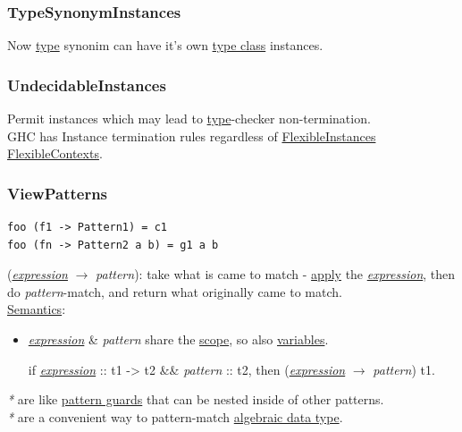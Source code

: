 \documentclass[a4paper,14pt,oneside]{book}
\begin{document}
\subsubsection{\label{orgf954c09}TypeSynonymInstances}
\label{sec:org66b1744}
Now \hyperref[orgb064f4e]{type} synonim can have it's own \hyperref[org876c934]{type class} instances.\\

\subsubsection{\label{org653eb04}UndecidableInstances}
\label{sec:orgac8f4fc}
Permit instances which may lead to \hyperref[orgb064f4e]{type}-checker non-termination.\\

GHC has Instance termination rules regardless of \hyperref[orga5fbc29]{FlexibleInstances} \hyperref[org9184c8b]{FlexibleContexts}.\\

\subsubsection{\label{org612f3f8}ViewPatterns}
\label{sec:org5387349}
\begin{verbatim}
foo (f1 -> Pattern1) = c1
foo (fn -> Pattern2 a b) = g1 a b
\end{verbatim}
(\emph{\hyperref[orgc25ca10]{expression}} \(\to\) \emph{pattern}): take what is came to match - \hyperref[orgfb0f605]{apply} the \emph{\hyperref[orgc25ca10]{expression}}, then do \emph{pattern}-match, and return what originally came to match.\\

\hyperref[org457e52f]{Semantics}:\\
\begin{itemize}
\item \emph{\hyperref[orgc25ca10]{expression}} \& \emph{pattern} share the \hyperref[orga3ec5be]{scope}, so also \hyperref[org03ce465]{variables}.\\
\item[{if \emph{\hyperref[orgc25ca10]{expression}} :: t1 -> t2 \&\& \emph{pattern} :: t2, then (\emph{\hyperref[orgc25ca10]{expression}} \(\to\) \emph{pattern})}] t1.\\
\end{itemize}

\emph{*} are like \hyperref[org6ed150d]{pattern guards} that can be nested inside of other patterns.\\
\emph{*} are a convenient way to pattern-match \hyperref[orgd9be4be]{algebraic data type}.\\
\end{document}
